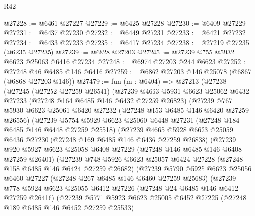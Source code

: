 \begin{lexlean}{R42}
\begin{coremodule}
{@27228 := @6461 @27227
@27229 := @6425 @27228
@27230 := @6409 @27229
@27231 := @6437 @27230
@27232 := @6449 @27231
@27233 := @6421 @27232
@27234 := @6433 @27233
@27235 := @6417 @27234
@27238 := @27219 @27235 (@6235 @27235)
@27239 := @6828 @27203
@27245 := @27239 @755 @5932 @6623 @25063 @6416 @27234
@27248 := @6974 @27203 @244 @6623
@27252 := @27248 @46 @6485 @146 @6416
@27259 := @6862 @27203 @146 @25078 (@6867 (@6868 @27203 @146))
@27479 := fun (m : @6404) =>
  @27213
    (@27238
      (@27245
        (@27252 @27259 @26541)
        (@27239
          @4663
          @5931
          @6623
          @25062
          @6432
          @27233
          (@27248 @164 @6485 @146 @6432 @27259 @26823)
          (@27239
            @767
            @5930
            @6623
            @25061
            @6420
            @27232
            (@27248 @153 @6485 @146 @6420 @27259 @26556)
            (@27239
              @5754
              @5929
              @6623
              @25060
              @6448
              @27231
              (@27248 @184 @6485 @146 @6448 @27259 @25518)
              (@27239
                @4665
                @5928
                @6623
                @25059
                @6436
                @27230
                (@27248 @169 @6485 @146 @6436 @27259 @26838)
                (@27239
                  @920
                  @5927
                  @6623
                  @25058
                  @6408
                  @27229
                  (@27248 @146 @6485 @146 @6408 @27259 @26401)
                  (@27239
                    @748
                    @5926
                    @6623
                    @25057
                    @6424
                    @27228
                    (@27248 @158 @6485 @146 @6424 @27259 @26682)
                    (@27239
                      @5790
                      @5925
                      @6623
                      @25056
                      @6460
                      @27227
                      (@27248 @267 @6485 @146 @6460 @27259 @25683)
                      (@27239
                        @778
                        @5924
                        @6623
                        @25055
                        @6412
                        @27226
                        (@27248 @24 @6485 @146 @6412 @27259 @26416)
                        (@27239
                          @5771
                          @5923
                          @6623
                          @25005
                          @6452
                          @27225
                          (@27248 @189 @6485 @146 @6452 @27259 @25533)
}
\end{coremodule}
\end{lexlean}

